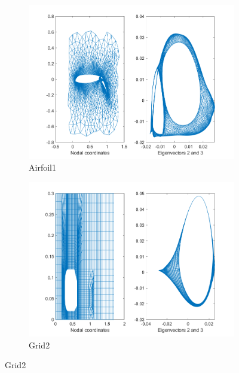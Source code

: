 \documentclass[unicode,11pt,a4paper,oneside,numbers=endperiod,openany]{scrartcl}
\begin{document}
\begin{figure}[H]
    \centering
    \begin{subfigure}{0.45\textwidth}
        \centering
        \includegraphics[width=\linewidth]{figures/2.1_airfoil1.png}
        \caption{Airfoil1}
        \label{fig:airfoil1}
    \end{subfigure}
    \hfill
    \begin{subfigure}{0.45\textwidth}
        \centering
        \includegraphics[width=\linewidth]{figures/2.1_grid2.png}
        \caption{Grid2}
        \label{fig:grid2}
    \end{subfigure}


\end{figure}
\end{document}
